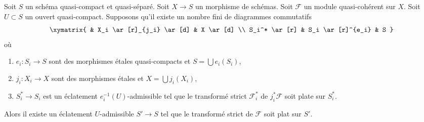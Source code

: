 \begin{lemma}
\label{lemma-flatten-module-etale-localize}
Soit $S$ un schéma quasi-compact et quasi-séparé.
Soit $X \to S$ un morphisme de schémas.
Soit $\mathcal{F}$ un module quasi-cohérent sur $X$.
Soit $U \subset S$ un ouvert quasi-compact.
Supposons qu'il existe un nombre fini de diagrammes commutatifs
$$
\xymatrix{
& X_i \ar[r]_{j_i} \ar[d] & X \ar[d] \\
S_i^* \ar[r] & S_i \ar[r]^{e_i} & S
}
$$
où
\begin{enumerate}
\item $e_i : S_i \to S$ sont des morphismes \'etales quasi-compacts et
$S = \bigcup e_i(S_i)$,
\item $j_i : X_i \to X$ sont des morphismes \'etales et
$X = \bigcup j_i(X_i)$,
\item $S^*_i \to S_i$ est un éclatement $e_i^{-1}(U)$-admissible
tel que le transformé strict $\mathcal{F}_i^*$ de $j_i^*\mathcal{F}$
soit plate sur $S^*_i$.
\end{enumerate}
Alors il existe un éclatement $U$-admissible $S' \to S$ tel que
le transformé strict de $\mathcal{F}$ soit plat sur $S'$.
\end{lemma}

